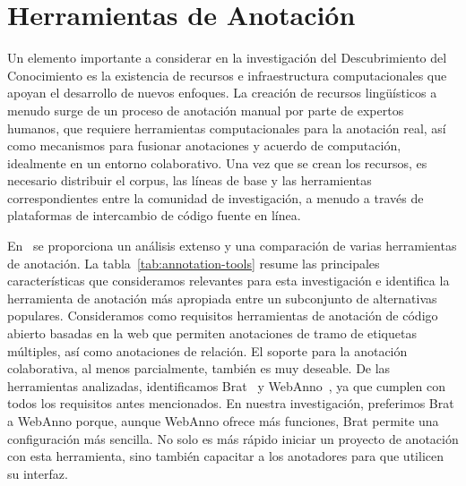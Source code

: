 \section{Herramientas de Anotación}

Un elemento importante a considerar en la investigación del Descubrimiento del Conocimiento es la existencia de recursos e infraestructura computacionales que apoyan el desarrollo de nuevos enfoques.
La creación de recursos lingüísticos a menudo surge de un proceso de anotación manual por parte de expertos humanos, que requiere herramientas computacionales para la anotación real, así como mecanismos para fusionar anotaciones y acuerdo de computación, idealmente en un entorno colaborativo.
Una vez que se crean los recursos, es necesario distribuir el corpus, las líneas de base y las herramientas correspondientes entre la comunidad de investigación, a menudo a través de plataformas de intercambio de código fuente en línea.

En~\citet{annotation-tools} se proporciona un análisis extenso y una comparación de varias herramientas de anotación.
La tabla~\ref{tab:annotation-tools} resume las principales características que consideramos relevantes para esta investigación e identifica la herramienta de anotación más apropiada entre un subconjunto de alternativas populares.
Consideramos como requisitos herramientas de anotación de código abierto basadas en la web que permiten anotaciones de tramo de etiquetas múltiples, así como anotaciones de relación. El soporte para la anotación colaborativa, al menos parcialmente, también es muy deseable.
De las herramientas analizadas, identificamos Brat~\cite{brat} y WebAnno~\cite{webanno}, ya que cumplen con todos los requisitos antes mencionados. En nuestra investigación, preferimos Brat a WebAnno porque, aunque WebAnno ofrece más funciones, Brat permite una configuración más sencilla. No solo es más rápido iniciar un proyecto de anotación con esta herramienta, sino también capacitar a los anotadores para que utilicen su interfaz.

